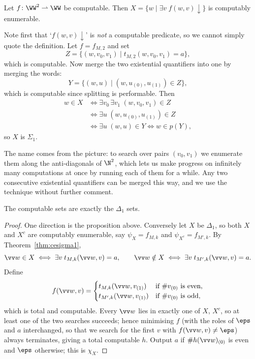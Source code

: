 \begin{example}\label{ex:zigzag}
	Let $f \colon \WW^2 \rightharpoonup \WW$ be computable. Then $X = \{w \mid \exists v\; f(w,v)\!\downarrow\}$ is computably enumerable.

	Note first that `$f(w,v)\!\downarrow$' is \emph{not} a computable predicate, so we cannot simply quote the definition. Let $f = f_{M,2}$ and set
	$$Z = \{(w,v_0,v_1) \mid t_{M,2}(w,v_0,v_1) = a\},$$
	which is computable. Now merge the two existential quantifiers into one by merging the words:
	$$Y = \{(w,u) \mid (w, u_{(0)}, u_{(1)}) \in Z\},$$
	which is computable since splitting is performable. Then
	\begin{align*}
		w \in X &\iff \exists v_0\, \exists v_1\; (w,v_0,v_1) \in Z \\
		&\iff \exists u\; (w, u_{(0)}, u_{(1)}) \in Z \\
		&\iff \exists u\; (w,u) \in Y \iff w \in p(Y),
	\end{align*}
	so $X$ is $\Sigma_1$.
\end{example}

The name comes from the picture: to search over pairs $(v_0,v_1)$ we enumerate them along the anti-diagonals of $\N^2$, which lets us make progress on infinitely many computations at once by running each of them for a while. Any two consecutive existential quantifiers can be merged this way, and we use the technique without further comment.

\begin{corollary}\label{cor:computabledelta1}
	The computable sets are exactly the $\Delta_1$ sets.
\end{corollary}

\begin{proof}
	One direction is the proposition above. Conversely let $X$ be $\Delta_1$, so both $X$ and $X^c$ are computably enumerable, say $\psi_X = f_{M,k}$ and $\psi_{X^c} = f_{M',k}$. By Theorem~\ref{thm:cesigma1},
	$$\vv w \in X \iff \exists v\; t_{M,k}(\vv w, v) = a, \qquad \vv w \notin X \iff \exists v\; t_{M',k}(\vv w, v) = a.$$
	Define
	$$f(\vv w, v) = \begin{cases} t_{M,k}(\vv w, v_{(1)}) & \text{if } \#v_{(0)} \text{ is even}, \\ t_{M',k}(\vv w, v_{(1)}) & \text{if } \#v_{(0)} \text{ is odd},\end{cases}$$
	which is total and computable. Every $\vv w$ lies in exactly one of $X$, $X^c$, so at least one of the two searches succeeds; hence minimising $f$ (with the roles of $\eps$ and $a$ interchanged, so that we search for the first $v$ with $f(\vv w, v) \neq \eps$) always terminates, giving a total computable $h$. Output $a$ if $\#h(\vv w)_{(0)}$ is even and $\eps$ otherwise; this is $\chi_X$.
\end{proof}

